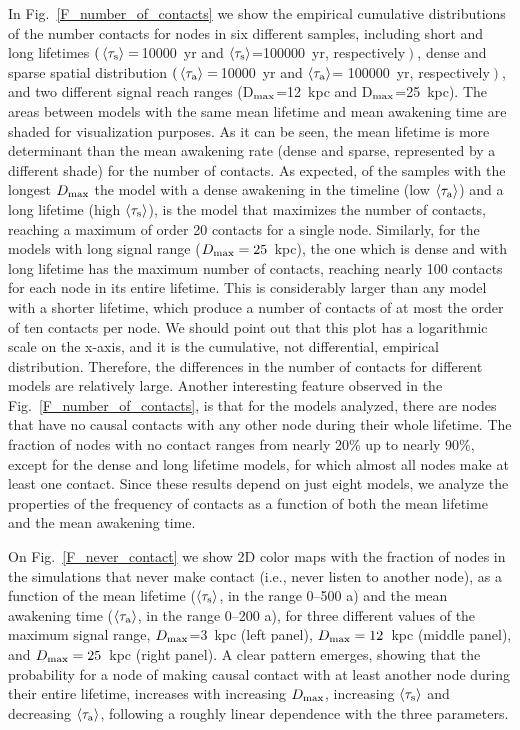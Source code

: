 \documentclass[crop]{CSLB}
\newcommand{\ceti}{node}
\newcommand{\cetis}{nodes}
\newcommand{\ffn}[1]{}
\begin{document}
\ffn{3}
%
In Fig.~\ref{F_number_of_contacts} we show the empirical cumulative
distributions of the number contacts for \cetis{} in six different
samples, including short and long lifetimes
$\left(\,\left<\tau_{\rm s}\right>=\right.$10000~yr and
$\left<\tau_{\rm s}\right>$=100000~yr, respectively$\left.\right)$, dense
and sparse spatial distribution
$\left(\,\left<\tau_{\rm a}\right>=\right.$10000~yr and
$\left<\tau_{\rm a}\right>$= 100000~yr, respectively$\left.\right)$, and two
different signal reach ranges (D$_{\rm max}$=12~kpc and D$_{\rm
max}$=25~kpc).
%
The areas between models with the same mean lifetime and mean
awakening time are shaded for visualization purposes.
%
As it can be seen, the mean lifetime is more determinant than the mean
awakening rate (dense and sparse, represented by a different shade)
for the number of contacts.
%
As expected, of the samples with the longest $D_{\rm max}$ the model
with a dense awakening in the timeline (low $\left<\tau_{\rm a}\right>$) and
a long lifetime (high $\left<\tau_{\rm s}\right>$), is the model that
maximizes the number of contacts, reaching a maximum of order 20
contacts for a single \ceti{}.
%
Similarly, for the models with long signal range ($D_{\rm
max}=25$~kpc), the one which is dense and with long lifetime has the
maximum number of contacts, reaching nearly 100 contacts for each
\ceti{} in its entire lifetime.
%
This is considerably larger than any model with a shorter lifetime,
which produce a number of contacts of at most the order of ten
contacts per \ceti{}.
%
We should point out that this plot has a logarithmic scale on the
x-axis, and it is the cumulative, not differential, empirical
distribution.
%
Therefore, the differences in the number of contacts for different
models are relatively large.
%
Another interesting feature observed in the
Fig.~\ref{F_number_of_contacts}, is that for the models analyzed,
there are \cetis{} that have no causal contacts with any other \ceti{}
during their whole lifetime.
%
The fraction of \cetis{} with no contact ranges from nearly 20\% up to
nearly 90\%, except for the dense and long lifetime models, for which
almost all \cetis{} make at least one contact.
%
Since these results depend on just eight models, we analyze the
properties of the frequency of contacts as a function of both the mean
lifetime and the mean awakening time.
%
\ffn{4}
%
On Fig.~\ref{F_never_contact} we show 2D color maps with the fraction
of \cetis{} in the simulations that never make contact (i.e., never
listen to another \ceti{}), as a function of the mean lifetime
($\left<\tau_{\rm s}\right>$, in the range 0--500 a) and the mean awakening
time ($\left<\tau_{\rm a}\right>$, in the range 0--200 a), for three
different values of the maximum signal range, $D_{\rm max}$=3~kpc
(left panel), $D_{\rm max}=12$~kpc (middle panel), and $D_{\rm
max}=25$~kpc (right panel).
%
A clear pattern emerges, showing that the probability for a \ceti{} of
making causal contact with at least another \ceti{} during their
entire lifetime, increases with increasing $D_{\rm max}$, increasing
$\left<\tau_{\rm s}\right>$ and decreasing $\left<\tau_{\rm a}\right>$, following
a roughly linear dependence with the three parameters.
\end{document}
